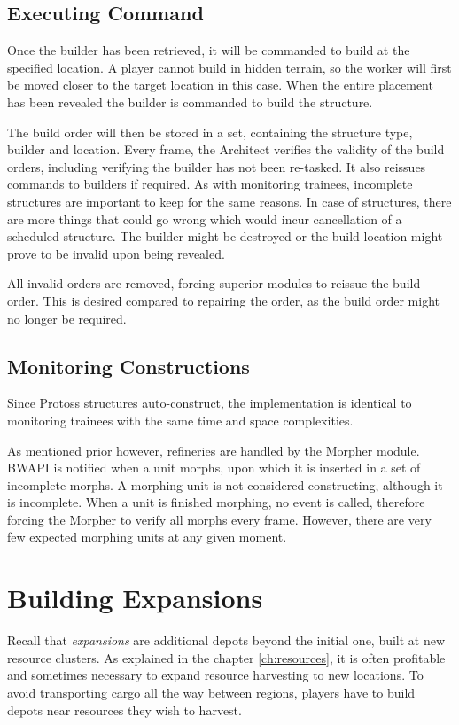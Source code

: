 	\subsection*{Executing Command}
	Once the builder has been retrieved, it will be commanded to build at the specified location. A player cannot build in hidden terrain, so the worker will first be moved closer to the target location in this case. When the entire placement has been revealed the builder is commanded to build the structure.
	
	The build order will then be stored in a set, containing the structure type, builder and location. Every frame, the Architect verifies the validity of the build orders, including verifying the builder has not been re-tasked. It also reissues commands to builders if required. As with monitoring trainees, incomplete structures are important to keep for the same reasons. In case of structures, there are more things that could go wrong which would incur cancellation of a scheduled structure. The builder might be destroyed or the build location might prove to be invalid upon being revealed.
	
	All invalid orders are removed, forcing superior modules to reissue the build order. This is desired compared to repairing the order, as the build order might no longer be required.
	
	\subsection*{Monitoring Constructions}
	Since Protoss structures auto-construct, the implementation is identical to monitoring trainees with the same time and space complexities.
	
	As mentioned prior however, refineries are handled by the Morpher module. BWAPI is notified when a unit morphs, upon which it is inserted in a set of incomplete morphs. A morphing unit is not considered constructing, although it is incomplete. When a unit is finished morphing, no event is called, therefore forcing the Morpher to verify all morphs every frame. However, there are very few expected morphing units at any given moment.

\section{Building Expansions}
\label{sec:expansions}
Recall that \emph{expansions} are additional depots beyond the initial one, built at new resource clusters. As explained in the chapter \ref{ch:resources}, it is often profitable and sometimes necessary to expand resource harvesting to new locations. To avoid transporting cargo all the way between regions, players have to build depots near resources they wish to harvest.


